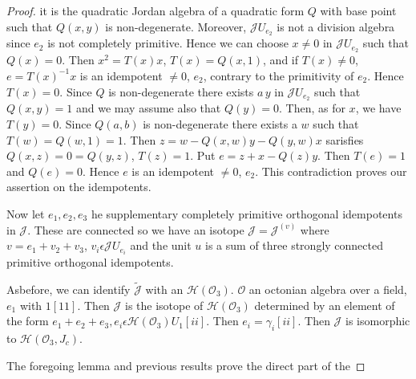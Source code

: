 \begin{proof}
  it is the quadratic Jordan algebra of a quadratic form $Q$ with base
  point such that $Q(x,y)$ is non-degenerate. Moreover, $\mathscr{J}
  U_{e_2}$ is not a division algebra since $e_2$ is not completely
  primitive. Hence we can choose $x\neq 0$ in $\mathscr{J}U_{e_2}$
  such that $Q(x)=0$. Then $x^{2}=T(x)x$, $T(x)=Q(x,1)$, and if
  $T(x)\neq 0$, $e=T(x)^{-1}x$ is an idempotent $\neq 0$, $e_2$,
  contrary to the primitivity of $e_2$. Hence $T(x)=0$. Since $Q$ is
  non-degenerate there exists $a \,y$ in $\mathscr{J} U_{e_2}$ such that
  $Q(x,y)=1$ and we may assume also that $Q(y)=0$. Then, as for $x$,
  we have $T(y)=0$. Since $Q(a,b)$ is non-degenerate there exists a
  $w$ such that $T(w)=Q(w,1)=1$. Then $z=w-Q(x,w)y-Q(y,w)x$ sarisfies
  $Q(x,z)=0=Q(y,z)$, $T(z)=1$. Put $e=z+x-Q(z)y$. Then $T(e)=1$ and
  $Q(e)=0$. Hence $e$ is an idempotent $\neq 0$, $e_2$. This
  contradiction proves our assertion on the idempotents.

Now let $e_1,e_2,e_3$ he supplementary completely primitive orthogonal
idempotents in $\mathscr{J}$. These are connected so we have an
isotope $\mathscr{J}=\mathscr{J}^{(v)}$ where $v=e_1+v_2+v_3$,
$v_i\epsilon \mathscr{J} U_{e_i}$ and the unit $u$ is a sum of three
strongly connected primitive orthogonal idempotents.

As\pageoriginale before, we can identify $\tilde{\mathscr{J}}$ with an
$\mathscr{H}(\mathcal{O}_3)$. $\mathcal{O}$ an octonian algebra over a
field, $e_1$ with $1[11]$. Then $\mathscr{J}$ is the isotope of
$\mathscr{H}(\mathcal{O}_3)$ determined by an element of the form
$e_1+e_2+e_3, e_i\epsilon \mathscr{H}(\mathcal{O}_3)U_1[ii]$. Then
$e_i=\gamma_i[ii]$. Then $\mathscr{J}$ is isomorphic to
$\mathscr{H}(\mathcal{O}_3, J_c)$.

The foregoing lemma and previous results prove the direct part of the
\end{proof}

